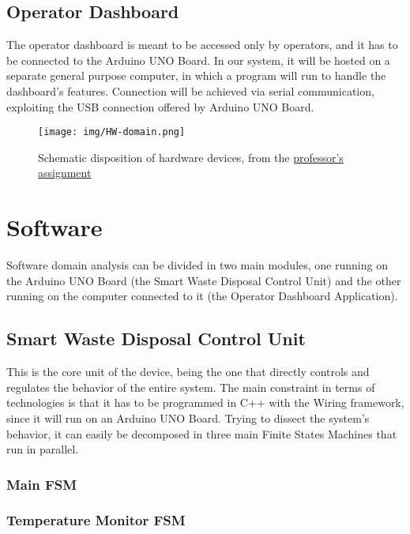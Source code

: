 \documentclass[a4paper,12pt]{report}
\begin{document}
	\subsection{Operator Dashboard}
	The operator dashboard is meant to be accessed only by operators, and it has to be connected to the Arduino UNO Board.\newline
	In our system, it will be hosted on a separate general purpose computer, in which a program will run to handle the dashboard's features. Connection will be achieved via serial communication, exploiting the USB connection offered by Arduino UNO Board.
	
	\begin{figure}[H]
		\centering{}
		\texttt{[image: img/HW-domain.png]}
		\caption{Schematic disposition of hardware devices, from the \href{https://docs.google.com/document/d/1iFXGmo7RVZMpJ5bxUN5ms_qFqg2B-wecRc0sfas9rQ4/edit?usp=sharing}{professor's assignment}}
		\label{img:hw-domain}
	\end{figure}
	
	\section{Software}
	Software domain analysis can be divided in two main modules, one running on the Arduino UNO Board (the Smart Waste Disposal Control Unit) and the other running on the computer connected to it (the Operator Dashboard Application).
	
	\subsection{Smart Waste Disposal Control Unit}
	This is the core unit of the device, being the one that directly controls and regulates the behavior of the entire system.\newline
	The main constraint in terms of technologies is that it has to be programmed in C++ with the Wiring framework, since it will run on an Arduino UNO Board. Trying to dissect the system's behavior, it can easily be decomposed in three main Finite States Machines that run in parallel.
	
	\subsubsection{Main FSM}
	
	\subsubsection{Temperature Monitor FSM}
	
\end{document}

